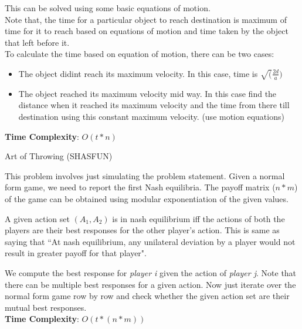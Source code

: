 \documentclass[solution,addpoints,12pt]{exam}
\begin{document}
\begin{questions}
\begin{solution}
    This can be solved using some basic equations of motion. \\
    Note that, the time for a particular object to reach destination is maximum of time for it to reach based on equations of motion and time taken
    by the object that left before it. \\
    
    To calculate the time based on equation of motion, there can be two cases:
    \begin{itemize}
      \item 
	The object didint reach its maximum velocity. In this case, time is $\sqrt(\frac{2d}{a})$
     \item
      The object reached its maximum velocity mid way. In this case find the distance when it reached its maximum velocity and the time from there till
      destination using this constant maximum velocity. (use motion equations)
    \end{itemize}
    
    \textbf{Time Complexity}: $O(t \ast n)$ \\
\end{solution}

\question

  Art of Throwing (SHASFUN)
  
\begin{solution}
	This problem involves just simulating the problem statement. Given a normal form game, we need to report the first Nash equilibria. The payoff matrix ($n \ast m$) of the game can be obtained using modular exponentiation of the given values. 
	
	A given action set $(A_1, A_2)$ is in nash equilibrium iff the actions of both the players are their best responses for the other player's action. This is same as saying that ``At nash equilibrium, any unilateral deviation by a player would not result in greater payoff for that player". 
	
	We compute the best response for \emph{player i} given the action of \emph{player j}. Note that there can be multiple best responses for a given action. Now just iterate over the normal form game row by row and check whether the given action set are their mutual best responses.\\
	
	\textbf{Time Complexity}: $O(t \ast (n*m))$ \\
 
\end{solution}



\end{questions}
\end{document}

